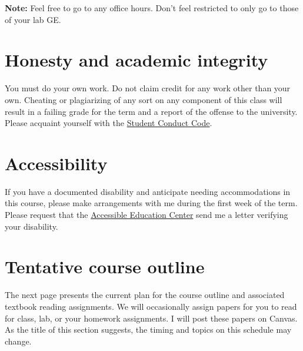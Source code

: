 \documentclass[10pt]{article}
\begin{document}
\noindent \textbf{Note:} Feel free to go to any office hours. Don't feel restricted to only go to those of your lab GE.

\section*{Honesty and academic integrity}

You must do your own work. Do not claim credit for any work other than your own. Cheating or plagiarizing of any sort on any component of this class will result in a failing grade for the term and a report of the offense to the university. Please acquaint yourself with the \href{http://studentlife.uoregon.edu}{Student Conduct Code}.

\section*{Accessibility}

If you have a documented disability and anticipate needing accommodations in this course, please make arrangements with me during the first week of the term. Please request that the \href{https://aec.uoregon.edu/}{Accessible Education Center} send me a letter verifying your disability.

\section*{Tentative course outline}

The next page presents the current plan for the course outline and associated textbook reading assignments. We will occasionally assign papers for you to read for class, lab, or your homework assignments. I will post these papers on Canvas. As the title of this section suggests, the timing and topics on this schedule may change.
\end{document}
